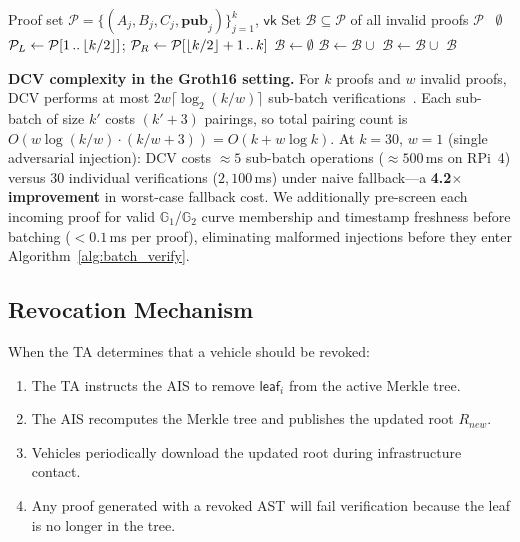 \begin{algorithm}[t]
\caption{DCV Fallback: Divide-and-Conquer Invalid Proof Isolation~\cite{ferrara2008finding}}
\label{alg:dcv_fallback}
\begin{algorithmic}[1]
\REQUIRE Proof set $\mathcal{P} = \{(A_j,B_j,C_j,\mathbf{pub}_j)\}_{j=1}^{k}$, $\mathsf{vk}$
\ENSURE Set $\mathcal{B} \subseteq \mathcal{P}$ of all invalid proofs
        \RETURN $\mathcal{P}$ \hfill {}
    \ELSE\ \RETURN $\emptyset$
    \ENDIF
\ENDIF
\STATE $\mathcal{P}_L \leftarrow \mathcal{P}[1 \mathinner{..} \lfloor k/2 \rfloor]$;\quad
       $\mathcal{P}_R \leftarrow \mathcal{P}[\lfloor k/2 \rfloor + 1 \mathinner{..} k]$
\STATE $\mathcal{B} \leftarrow \emptyset$
    \STATE $\mathcal{B} \leftarrow \mathcal{B} \cup$ 
\ENDIF
{}
    \STATE $\mathcal{B} \leftarrow \mathcal{B} \cup$ 
\ENDIF
\RETURN $\mathcal{B}$
\end{algorithmic}
\end{algorithm}

\noindent\textbf{DCV complexity in the Groth16 setting.}
For $k$ proofs and $w$ invalid proofs, DCV performs at most $2w\lceil\log_2(k/w)\rceil$
sub-batch verifications~\cite{ferrara2008finding}. Each sub-batch of size $k'$ costs
$(k'+3)$ pairings, so total pairing count is
$O(w \log(k/w) \cdot (k/w + 3)) = O(k + w \log k)$.
At $k=30$, $w=1$ (single adversarial injection): DCV costs $\approx 5$ sub-batch
operations ($\approx 500$\,ms on RPi~4) versus $30$ individual verifications
($2{,}100$\,ms) under naive fallback---a \textbf{4.2$\times$ improvement} in
worst-case fallback cost. We additionally pre-screen each incoming proof for valid
$\mathbb{G}_1$/$\mathbb{G}_2$ curve membership and timestamp freshness before
batching ($< 0.1$\,ms per proof), eliminating malformed injections before they enter
Algorithm~\ref{alg:batch_verify}.

\subsection{Revocation Mechanism}

When the TA determines that a vehicle should be revoked:
\begin{enumerate}
    \item The TA instructs the AIS to remove $\mathsf{leaf}_i$ from the active
    Merkle tree.
    \item The AIS recomputes the Merkle tree and publishes the updated root
    $R_{new}$.
    \item Vehicles periodically download the updated root during infrastructure
    contact.
    \item Any proof generated with a revoked AST will fail verification because
    the leaf is no longer in the tree.
\end{enumerate}

